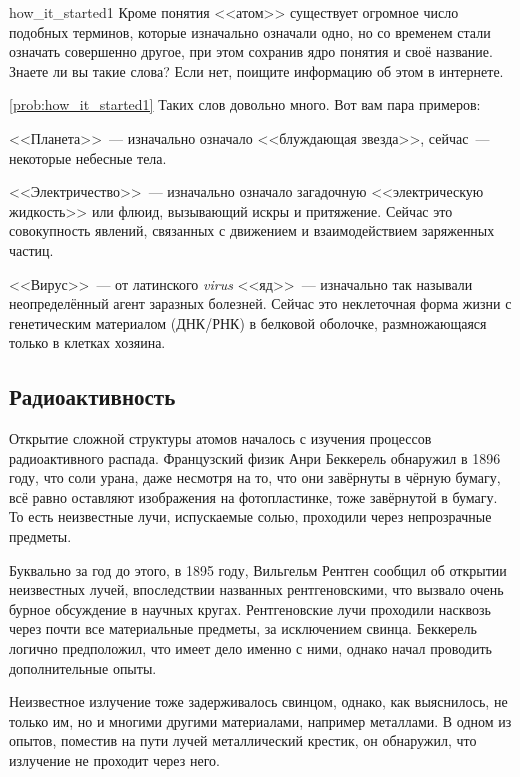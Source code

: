 \begin{problem}{}{how_it_started1}
    Кроме понятия <<атом>> существует огромное число подобных терминов, которые изначально означали одно, но со временем стали означать совершенно другое, при этом сохранив ядро понятия и своё название. Знаете ли вы такие слова? Если нет, поищите информацию об этом в интернете.

    \begin{sol}{\ref{prob:how_it_started1}}
        Таких слов довольно много. Вот вам пара примеров:

        <<Планета>>~--- изначально означало <<блуждающая звезда>>, сейчас~--- некоторые небесные тела.

        <<Электричество>>~--- изначально означало загадочную <<электрическую жидкость>> или флюид, вызывающий искры и притяжение. Сейчас это совокупность явлений, связанных с движением и взаимодействием заряженных частиц.

        <<Вирус>>~--- от латинского \textit{virus} <<яд>>~--- изначально так называли неопределённый агент заразных болезней. Сейчас это неклеточная форма жизни с генетическим материалом (ДНК/РНК) в белковой оболочке, размножающаяся только в клетках хозяина.
    \end{sol}
\end{problem}

\subsection*{Радиоактивность}

Открытие сложной структуры атомов началось с изучения процессов радиоактивного распада. Французский физик Анри Беккерель обнаружил в 1896 году, что соли урана, даже несмотря на то, что они завёрнуты в чёрную бумагу, всё равно оставляют изображения на фотопластинке, тоже завёрнутой в бумагу. То есть неизвестные лучи, испускаемые солью, проходили через непрозрачные предметы.

Буквально за год до этого, в 1895 году, Вильгельм Рентген сообщил об открытии неизвестных лучей, впоследствии названных рентгеновскими, что вызвало очень бурное обсуждение в научных кругах. Рентгеновские лучи проходили насквозь через почти все материальные предметы, за исключением свинца. Беккерель логично предположил, что имеет дело именно с ними, однако начал проводить дополнительные опыты.

Неизвестное излучение тоже задерживалось свинцом, однако, как выяснилось, не только им, но и многими другими материалами, например металлами. В одном из опытов, поместив на пути лучей металлический крестик, он обнаружил, что излучение не проходит через него.

